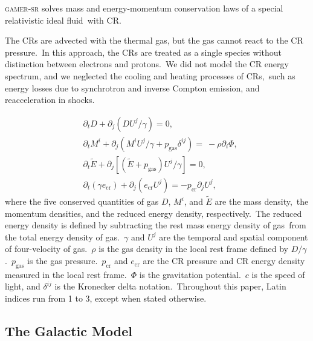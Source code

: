 \documentclass[twocolumn]{aastex631}
\begin{document}
\textsc{gamer-sr} solves mass and energy-momentum conservation laws of a special relativistic ideal fluid\
with CR.

The CRs are advected with the thermal gas, but the gas cannot react to the CR pressure.\
In this approach, the CRs are treated as a single species without distinction between electrons and protons.\
We did not model the CR energy spectrum, and we neglected the cooling and heating processes of CRs,\
such as energy losses due to synchrotron and inverse Compton emission, and reacceleration in shocks.\

\begin{subequations}
  \label{conservative-form}
  \begin{align}
   &\partial_{t} D+\partial_{j} \left(DU^{j}/\gamma\right)=0,\label{D evolution}\\
   &\partial_{t} M^{i}+\partial_{j} \left(M^{i}U^{j}/\gamma+p_{\text{gas}}\delta^{ij}\right)=\
   -\rho\partial_{i}\Phi,\label{M evolution}\\
   &\partial_{t} \tilde{E}+\partial_j \left[\left(\tilde{E}+p_{\text{gas}}\right)U^{j}/\gamma\right]=0, \label{E evoltion}\\
   &\partial_{t} \left(\gamma e_{\text{cr}}\right) + \partial_{j} \left(e_{\text{cr}}U^{j}\right)=-p_{\text{cr}} \partial_{j} U^{j},\label{D evolution}
  \end{align}
\end{subequations}
where the five conserved quantities of gas $D$, $M^{i}$, and $\tilde{E}$ are the mass density,\
the momentum densities, and the reduced energy density, respectively.\
The reduced energy density is defined by subtracting the rest mass energy density of gas\
from the total energy density of gas.\
$\gamma$ and $U^{j}$ are the temporal and spatial component of four-velocity of gas.\
$\rho$ is the gas density in the local rest frame defined by $D/\gamma$.\
$p_{\text{gas}}$ is the gas pressure.\
$p_{\text{cr}}$ and $e_{\text{cr}}$ are the CR pressure and CR energy density measured in the local rest frame.\
$\Phi$ is the gravitation potential.\
$c$ is the speed of light, and $\delta^{ij}$ is the Kronecker delta notation.\
Throughout this paper, Latin indices run from 1 to 3, except when stated otherwise.

\subsection{The Galactic Model}
\end{document}
